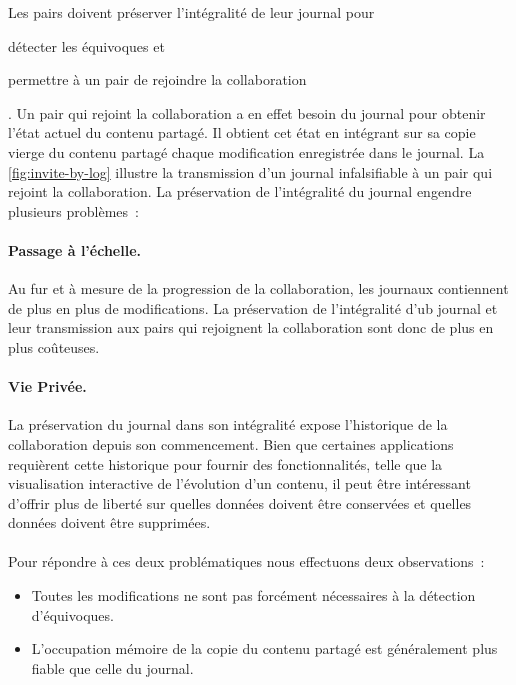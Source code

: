 Les pairs doivent préserver l'intégralité de leur journal pour \begin{inlinelist}
\item détecter les équivoques et
\item permettre à un pair de rejoindre la collaboration
\end{inlinelist}.
Un pair qui rejoint la collaboration a en effet besoin du journal pour obtenir l'état actuel du contenu partagé.
Il obtient cet état en intégrant sur sa copie vierge du contenu partagé chaque modification enregistrée dans le journal.
La \autoref{fig:invite-by-log} illustre la transmission d'un journal infalsifiable à un pair qui rejoint la collaboration.
La préservation de l'intégralité du journal engendre plusieurs problèmes~:

\paragraph{Passage à l'échelle.} Au fur et à mesure de la progression de la collaboration, les journaux contiennent de plus en plus de modifications.
La préservation de l'intégralité d'ub journal et leur transmission aux pairs qui rejoignent la collaboration sont donc de plus en plus coûteuses.

\paragraph{Vie Privée.} La préservation du journal dans son intégralité expose l'historique de la collaboration depuis son commencement.
Bien que certaines applications requièrent cette historique pour fournir des fonctionnalités, telle que la visualisation interactive de l'évolution d'un contenu, il peut être intéressant d'offrir plus de liberté sur quelles données doivent être conservées et quelles données doivent être supprimées.

\paragraph{} Pour répondre à ces deux problématiques nous effectuons deux observations~:
\begin{itemize}
    \item Toutes les modifications ne sont pas forcément nécessaires à la détection d'équivoques.
    \item L'occupation mémoire de la copie du contenu partagé est généralement plus fiable que celle du journal.
\end{itemize}

